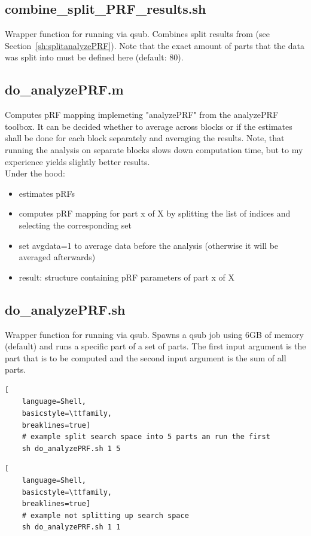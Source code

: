 \documentclass[12pt,a4paper]{scrartcl}
\begin{document}
\subsection{combine\_split\_PRF\_results.sh}
\label{sh:combsplt}
Wrapper function for running \texttt{} via qsub. Combines split results from \texttt{} (see Section~\ref{sh:splitanalyzePRF}). Note that the exact amount of parts that the data was split into must be defined here (default: 80).\\

\subsection{do\_analyzePRF.m}
\label{m:analyzePRF}
Computes pRF mapping implemeting "analyzePRF" from the analyzePRF toolbox. It can be decided whether to average across blocks or if the estimates shall be done for each block separately and averaging the results. Note, that running the analysis on separate blocks slows down computation time, but to my experience yields slightly better results.\\

\noindent Under the hood:
\begin{itemize}
\item estimates pRFs
\item computes pRF mapping for part x of X by splitting the list of indices and selecting the corresponding set
\item set avgdata=1 to average data before the analysis (otherwise it will be averaged afterwards)
\item result: structure containing pRF parameters of part x of X
\end{itemize}

\subsection{do\_analyzePRF.sh}
\label{sh:analyzePRF}
Wrapper function for running \texttt{} via qsub. Spawns a qsub job using 6GB of memory (default) and runs a specific part of a set of parts. The first input argument is the part that is to be computed and the second input argument is the sum of all parts.
\begin{lstlisting}[
    language=Shell,
    basicstyle=\ttfamily,
    breaklines=true]
    # example split search space into 5 parts an run the first
    sh do_analyzePRF.sh 1 5
\end{lstlisting}
\begin{lstlisting}[
    language=Shell,
    basicstyle=\ttfamily,
    breaklines=true]
    # example not splitting up search space
    sh do_analyzePRF.sh 1 1
\end{lstlisting}
\end{document}
